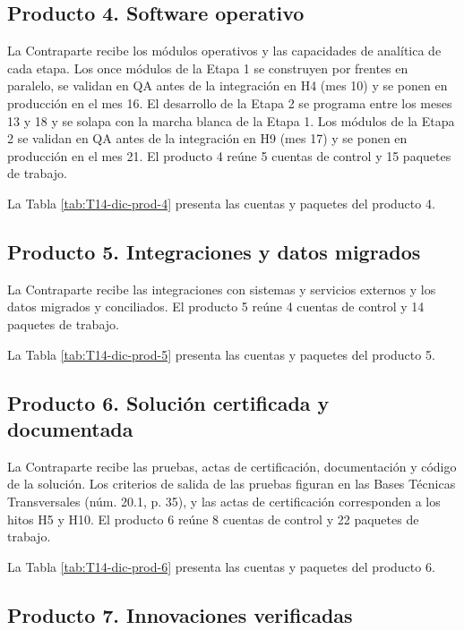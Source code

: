 \subsection{Producto 4. Software operativo}

La Contraparte recibe los módulos operativos y las capacidades de analítica de cada etapa. Los once módulos de la Etapa 1 se construyen por frentes en paralelo, se validan en QA antes de la integración en H4 (mes 10) y se ponen en producción en el mes 16. El desarrollo de la Etapa 2 se programa entre los meses 13 y 18 y se solapa con la marcha blanca de la Etapa 1. Los módulos de la Etapa 2 se validan en QA antes de la integración en H9 (mes 17) y se ponen en producción en el mes 21.
El producto 4 reúne 5 cuentas de control y 15 paquetes de trabajo.

La Tabla \ref{tab:T14-dic-prod-4} presenta las cuentas y paquetes del producto 4.

\subsection{Producto 5. Integraciones y datos migrados}

La Contraparte recibe las integraciones con sistemas y servicios externos y los datos migrados y conciliados.
El producto 5 reúne 4 cuentas de control y 14 paquetes de trabajo.

La Tabla \ref{tab:T14-dic-prod-5} presenta las cuentas y paquetes del producto 5.

\subsection{Producto 6. Solución certificada y documentada}

La Contraparte recibe las pruebas, actas de certificación, documentación y código de la solución. Los criterios de salida de las pruebas figuran en las Bases Técnicas Transversales (núm. 20.1, p. 35), y las actas de certificación corresponden a los hitos H5 y H10.
El producto 6 reúne 8 cuentas de control y 22 paquetes de trabajo.

La Tabla \ref{tab:T14-dic-prod-6} presenta las cuentas y paquetes del producto 6.

\subsection{Producto 7. Innovaciones verificadas}

